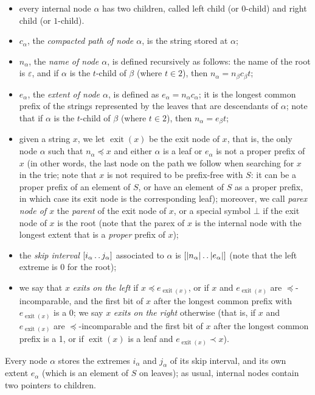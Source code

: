 \documentclass[a4paper]{article}
\newcommand{\exit}[1]{\operatorname{exit}(#1)}
\newcommand{\?}{\mskip1.5mu}
\def\..{\,\mathpunct{\ldotp\ldotp}} %
\renewcommand{\epsilon}{\varepsilon}
\begin{document}
\begin{itemize}
    \item every internal node $\alpha$ has two children, called left child (or $0$-child)
    and right child (or $1$-child).
	\item $c_\alpha$, the \emph{compacted path of node $\alpha$}, is the string
	stored at $\alpha$;
	\item $n_\alpha$, the \emph{name of node $\alpha$}, is defined recursively as
	follows: the name of the root is $\epsilon$, and if $\alpha$ is the $t$-child
	of $\beta$ (where $t \in 2$), then $n_\alpha=n_\beta c_\beta  t$;
	\item $e_\alpha$, the \emph{extent of node $\alpha$}, is defined as $e_\alpha=n_\alpha c_\alpha$;
	it is the longest common prefix of the strings represented by the leaves 
	that are descendants of $\alpha$; note that if $\alpha$ is the $t$-child
	of $\beta$ (where $t \in 2$), then $n_\alpha=e_\beta t$;
	\item given a string $x$, we let $\exit x$ be the exit node of $x$, that is,
	the only node $\alpha$ such that $n_\alpha \preceq x$ and either $\alpha$ is a leaf or $e_\alpha$
	is not a proper prefix of $x$ (in other words, the last node on the path we follow when 
	searching for $x$ in the trie; note that $x$ is not required to be prefix-free with $S$: 
	it can be a proper prefix of an element of $S$, or have an element of $S$ as a proper prefix,
	in which case its exit node is the corresponding leaf); moreover, we call \emph{parex node of $x$} the
	\emph{parent} of the exit node of $x$, or a special symbol $\bot$ if the exit
	node of $x$ is the root (note that the parex of $x$ is the internal node with the
	longest extent that is a \emph{proper} prefix of $x$);
	\item the \emph{skip interval} $[i_\alpha\..j_\alpha]$ associated to
	$\alpha$ is $[|n_\alpha|\..|e_\alpha|]$ (note that the left extreme is
	$0$ for the root);
	\item we say that $x$ \emph{exits on the left} if $x \preceq e_{\exit x}$, or if $x$ and $e_{\exit x}$ 
	are $\preceq$-incomparable,
	and the first bit of $x$ after the longest common prefix with $e_{\exit x}$ is a 0; we say $x$ \emph{exits
	on the right} otherwise (that is, if $x$ and $e_{\exit x}$ are $\preceq$-incomparable 
	and the first bit of $x$ after the longest common prefix is a 1, or if
	$\exit x$ is a leaf and $e_{\exit x}\prec x$).
\end{itemize}

Every node $\alpha$ stores the extremes $i_\alpha$ and $j_\alpha$ of its skip interval, and its
own extent $e_\alpha$ (which is an element of $S$ on leaves); as usual, internal nodes contain two pointers to children.
\end{document}
